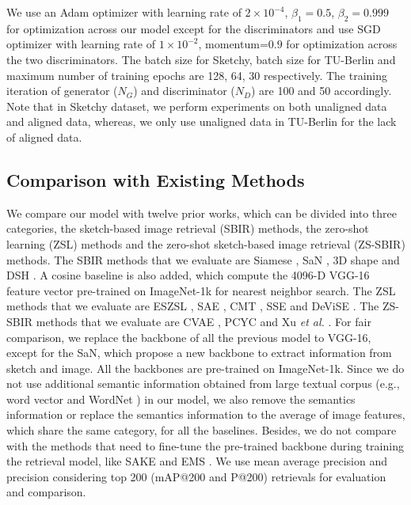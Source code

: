\documentclass[10pt,twocolumn,letterpaper]{article}
\begin{document}
We use an Adam \cite{kingma2014adam} optimizer with learning rate of $2 \times 10^{-4}$, $\beta_1 = 0.5$, $\beta_2 = 0.999$ for optimization across our model except for the discriminators and use SGD optimizer with learning rate of $1 \times 10^{-2}$, momentum=$0.9$ for optimization across the two discriminators. The batch size for Sketchy, batch size for TU-Berlin and maximum number of training epochs are 128, 64, 30 respectively. The training iteration of generator ($N_{G}$) and discriminator ($N_{D}$) are 100 and 50 accordingly. Note that in Sketchy dataset, we perform experiments on both unaligned data and aligned data, whereas, we only use unaligned data in TU-Berlin for the lack of aligned data.

\subsection{Comparison with Existing Methods}
We compare our model with twelve prior works, which can be divided into three categories, the sketch-based image retrieval (SBIR) methods, the zero-shot learning (ZSL) methods and the zero-shot sketch-based image retrieval (ZS-SBIR) methods. 
The SBIR methods that we evaluate are Siamese \cite{yelamarthi2018zero}, SaN \cite{yu2017sketch}, 3D shape \cite{wang2015sketch} and DSH \cite{liu2017deep}. A cosine baseline is also added, which compute the 4096-D VGG-16 \cite{simonyan2014very} feature vector pre-trained on ImageNet-1k for nearest neighbor search.
The ZSL methods that we evaluate are ESZSL \cite{romera2015embarrassingly}, SAE \cite{kodirov2017semantic}, CMT \cite{socher2013zero}, SSE \cite{zhang2015bit} and DeViSE \cite{frome2013devise}.
The ZS-SBIR methods that we evaluate are CVAE \cite{yelamarthi2018zero}, PCYC \cite{dutta2019semantically} and Xu \textit{et al.} \cite{xu2019semantic}.
For fair comparison, we replace the backbone of all the previous model to VGG-16, except for the SaN, which propose a new backbone to extract information from sketch and image. 
All the backbones are pre-trained on ImageNet-1k. 
Since we do not use additional semantic information obtained from large textual corpus (e.g., word vector \cite{mikolov2013distributed} and WordNet \cite{miller1998wordnet}) in our model, we also remove the semantics information or replace the semantics information to the average of image features, which share the same category, for all the baselines. 
Besides, we do not compare with the methods that need to fine-tune the pre-trained backbone during training the retrieval model, like SAKE \cite{liu2019semantic} and EMS \cite{lu2018learning}. 
We use mean average precision and precision considering top 200 (mAP@200 and P@200) retrievals for evaluation and comparison.
\end{document}
